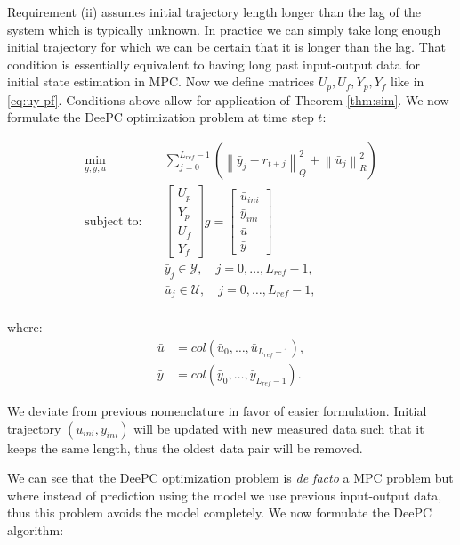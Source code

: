 \documentclass[12pt,a4paper]{report}
\newcommand{\norm}[1]{\left\lVert #1 \right\rVert}
\begin{document}
Requirement (ii) assumes initial trajectory length longer than the lag of the system which is typically unknown. In practice we can simply take long enough initial trajectory for which
we can be certain that it is longer than the lag. That condition is essentially equivalent to having long past input-output data for initial state estimation in MPC. Now we define matrices
$U_p, U_f, Y_p, Y_f$ like in \eqref{eq:uy-pf}. Conditions above allow for application of Theorem \ref{thm:sim}. We now formulate the DeePC optimization problem at time step $t$:

\begin{equation}
    \begin{aligned}
        \min_{g,y,u} \quad  &\sum_{j=0}^{L_{ref}-1} \left(\norm{\bar{y}_j - r_{t+j}}^{2}_{Q} + \norm{\bar{u}_j}^{2}_{R}\right) \\
        \text{subject to:} \quad & \begin{bmatrix} U_p \\ Y_p \\ U_f \\ Y_f\end{bmatrix}g = \begin{bmatrix} \bar{u}_{ini} \\ \bar{y}_{ini} \\ \bar{u} \\ \bar{y}\end{bmatrix}\\
        &\bar{y}_j \in \mathcal{Y}, \quad j=0,\dots,L_{ref}-1, \\
        &\bar{u}_j \in \mathcal{U}, \quad j=0,\dots,L_{ref}-1, \\
    \end{aligned}
    \label{eq:deepc}
\end{equation}

where:
\begin{align*}
    \bar{u} &= col(\bar{u}_0, \dots, \bar{u}_{L_{ref} - 1}), \\
    \bar{y} &= col(\bar{y}_0, \dots, \bar{y}_{L_{ref} - 1}).
\end{align*}

We deviate from previous nomenclature in favor of easier formulation. Initial trajectory $(u_{ini}, y_{ini})$ will be updated with new measured data such that it keeps the same length, thus the oldest
data pair will be removed.

\vspace{1em}

We can see that the DeePC optimization problem is \textit{de facto} a MPC problem but where instead of prediction using the model we use previous input-output data, thus this problem avoids the model
completely. We now formulate the DeePC algorithm:
\end{document}
